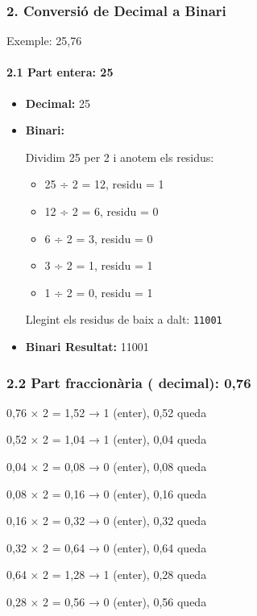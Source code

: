 \documentclass[
  12 pt,
  a4paper,
]{article}
\providecommand{\tightlist}{%
  \setlength{\itemsep}{0pt}\setlength{\parskip}{0pt}}
\begin{document}
\subsubsection{2. Conversió de Decimal a
Binari}\label{conversiuxf3-de-decimal-a-binari}

Exemple: 25,76

\paragraph{2.1 Part entera: 25}\label{part-entera-25}

\begin{itemize}
\item
  \textbf{Decimal:} 25
\item
  \textbf{Binari:}

  Dividim 25 per 2 i anotem els residus:

  \begin{itemize}
  \tightlist
  \item
    25 ÷ 2 = 12, residu = 1
  \item
    12 ÷ 2 = 6, residu = 0
  \item
    6 ÷ 2 = 3, residu = 0
  \item
    3 ÷ 2 = 1, residu = 1
  \item
    1 ÷ 2 = 0, residu = 1
  \end{itemize}

  Llegint els residus de baix a dalt: \texttt{11001}
\item
  \textbf{Binari Resultat:} 11001
\end{itemize}

\subsubsection{2.2 Part fraccionària ( decimal):
0,76}\label{part-fraccionuxe0ria-decimal-076}

0,76 × 2 = 1,52 → 1 (enter), 0,52 queda

0,52 × 2 = 1,04 → 1 (enter), 0,04 queda

0,04 × 2 = 0,08 → 0 (enter), 0,08 queda

0,08 × 2 = 0,16 → 0 (enter), 0,16 queda

0,16 × 2 = 0,32 → 0 (enter), 0,32 queda

0,32 × 2 = 0,64 → 0 (enter), 0,64 queda

0,64 × 2 = 1,28 → 1 (enter), 0,28 queda

0,28 × 2 = 0,56 → 0 (enter), 0,56 queda
\end{document}

